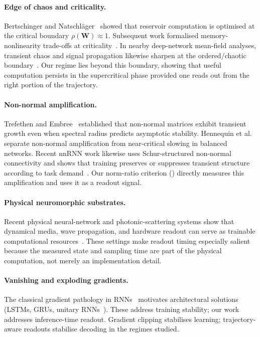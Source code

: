 \documentclass{article}
\theoremstyle{remark}
\newcommand{\bW}{\mathbf{W}}
\newcommand{\sr}{\rho(\bW)}
\begin{document}
\paragraph{Edge of chaos and criticality.}
Bertschinger and Natschl\"ager~\citep{bertschinger2004real} showed that
reservoir computation is optimised at the critical boundary $\sr \approx 1$.
Subsequent work formalised memory-nonlinearity trade-offs at
criticality~\citep{dambre2012information}. In nearby deep-network mean-field
analyses, transient chaos and signal propagation likewise sharpen at the
ordered/chaotic boundary~\citep{poole2016exponential,schoenholz2017deep}.
Our regime lies beyond this boundary, showing that useful computation
persists in the supercritical phase provided one reads out from the right
portion of the trajectory.

\paragraph{Non-normal amplification.}
Trefethen and Embree~\citep{trefethen2005spectra} established that non-normal
matrices exhibit transient growth even when spectral radius predicts
asymptotic stability. Hennequin et al.~\citep{hennequin2012nonnormal}
separate non-normal amplification from near-critical slowing in balanced
networks. Recent nnRNN work likewise uses Schur-structured non-normal
connectivity and shows that training preserves or suppresses transient
structure according to task demand~\citep{kerg2019nonnormal}. Our norm-ratio
criterion () directly measures this amplification and uses it
as a readout signal.

\paragraph{Physical neuromorphic substrates.}
Recent physical neural-network and photonic-scattering systems show that
dynamical media, wave propagation, and hardware readout can serve as
trainable computational resources~\citep{momeni2025training,
wanjura2025fully,wang2024large}. These settings make readout timing
especially salient because the measured state and sampling time are part of
the physical computation, not merely an implementation detail.

\paragraph{Vanishing and exploding gradients.}
The classical gradient pathology in RNNs~\citep{pascanu2013difficulty,
bengio1994learning} motivates architectural solutions (LSTMs, GRUs,
unitary RNNs~\citep{arjovsky2016unitary}). These address training stability;
our work addresses inference-time readout. Gradient clipping stabilises
learning; trajectory-aware readouts stabilise decoding in the regimes studied.
\end{document}
